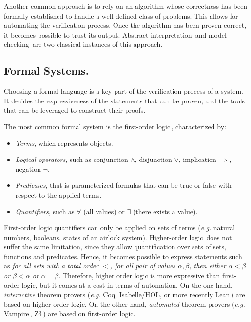 Another common approach  is to rely on an algorithm whose correctness has been
formally established to handle a well-defined class of problems.
%
This allows for automating the verification process.
%
Once the algorithm has been proven correct, it becomes possible to trust its
output.
%
Abstract interpretation\,\cite{cousot1977absint} and model
checking\,\cite{clarke2018modelc} are two classical instances of this approach.

\subsection{Formal Systems.}
%
Choosing a formal language is a key part of the verification process of a
system.
%
It decides the expressiveness of the statements that can be proven, and the
tools that can be leveraged to construct their proofs.

The most common formal system is the first-order logic\,\cite{smullyan2012fol},
characterized by:
%
\begin{itemize}
\item \emph{Terms}, which represents objects.
\item \emph{Logical operators}, such as conjunction \( \wedge \), disjunction
  \( \vee \), implication \( \Rightarrow \), negation \( \neg \).
\item \emph{Predicates}, that is parameterized formulas that can be true or
  false with respect to the applied terms.
\item \emph{Quantifiers}, such as \( \forall \) (all values) or \( \exists \)
  (there exists a value).
\end{itemize}

First-order logic quantifiers can only be applied on sets of terms (\emph{e.g.}
natural numbers, booleans, states of an airlock system).
%
Higher-order logic\,\cite{leivant1994hol} does not suffer the same limitation,
since they allow quantification over sets of sets, functions and predicates.
%
Hence, it becomes possible to express statements such as \emph{for all sets with
  a total order \( < \), for all pair of values \( \alpha, \beta \), then either
  \( \alpha < \beta \) or \( \beta < \alpha \) or \( \alpha = \beta \)}.
%
Therefore, higher order logic is more expressive than first-order logic, but it
comes at a cost in terms of automation.
%
On the one hand, \emph{interactive} theorem provers (\emph{e.g.}  Coq,
Isabelle/HOL, or more recently Lean\,\cite{de2015lean}) are based on
higher-order logic.
%
On the other hand, \emph{automated} theorem provers (\emph{e.g.}
Vampire\,\cite{riazanov2002vampire}, Z3\,\cite{de2008z3}) are based on
first-order logic. 

